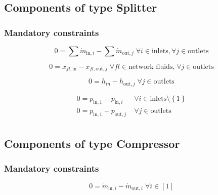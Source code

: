 \subsection{Components of type Splitter}

\subsubsection{Mandatory constraints}

\begin{equation}
\label{eq:Splitter_mass_flow_constraints}
0 =\sum\dot{m}_{\mathrm{in},i}-\sum\dot{m}_{\mathrm{out},j}\;\forall i \in \text{inlets}, \forall j \in \text{outlets}
\end{equation}

\begin{equation}
\label{eq:Splitter_fluid_constraints}
0 = x_{fl\mathrm{,in}} - x_{fl\mathrm{,out,}j}\; \forall fl \in \text{network fluids,} \; \forall j \in\text{outlets}
\end{equation}

\begin{equation}
\label{eq:Splitter_energy_balance_constraints}
0=h_{in}-h_{\mathrm{out,}j}\;\forall j \in\text{outlets}
\end{equation}

\begin{equation}
\label{eq:Splitter_pressure_constraints}
\begin{split}
0 = p_\mathrm{in,1} - p_{\mathrm{in,}i} & \; \forall i \in \text{inlets} \setminus \left\lbrace 1\right\rbrace\\
0 = p_\mathrm{in,1} - p_{\mathrm{out,}j} & \; \forall j \in \text{outlets}\\
\end{split}
\end{equation}


\subsection{Components of type Compressor}

\subsubsection{Mandatory constraints}

\begin{equation}
\label{eq:Compressor_mass_flow_constraints}
0=\dot{m}_{\mathrm{in,}i}-\dot{m}_{\mathrm{out,}i}\; \forall i \in [1]
\end{equation}

